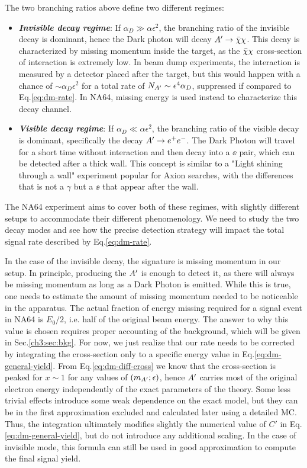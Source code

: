 The two branching ratios above define two different regimes:
\begin{itemize}
\item \textbf{\textit{Invisible decay regime}}: If $\alpha_D \gg \alpha \epsilon^2$, the branching ratio of the invisible decay is dominant, hence the Dark photon will decay $A' \to \bar{\chi} \chi$. This decay is characterized by missing momentum inside the target, as the $\bar{\chi} \chi$ cross-section of interaction is extremely low. In beam dump experiments, the interaction is measured by a detector placed after the target, but this would happen with a chance of $\sim \alpha_D \epsilon^2$ for a total rate of $N_{A'} \sim \epsilon^4 \alpha_D$, suppressed if compared to Eq.\ref{eq:dm-rate}. In NA64, missing energy is used instead to characterize this decay channel. 
\item \textbf{\textit{Visible decay regime}}: If $\alpha_D \ll \alpha \epsilon^2$, the branching ratio of the visible decay is dominant, specifically the decay $A' \to e^+e^-$. The Dark Photon will travel for a short time without interaction and then decay into a $\ee$ pair, which can be detected after a thick wall. This concept is similar to a "Light shining through a wall" experiment popular for Axion searches, with the differences that is not a $\gamma$ but a $\ee$ that appear after the wall.
\end{itemize}

The NA64 experiment aims to cover both of these regimes, with slightly different setups to accommodate their different phenomenology. We need to study the two decay modes and see how the precise detection strategy will impact the total signal rate described by Eq.\ref{eq:dm-rate}.

In the case of the invisible decay, the signature is missing momentum in our setup. In principle, producing the $A'$ is enough to detect it, as there will always be missing momentum as long as a Dark Photon is emitted. While this is true, one needs to estimate the amount of missing momentum needed to be noticeable in the apparatus. The actual fraction of energy missing required for a signal event in NA64 is $E_0/2$, i.e. half of the original beam energy. The answer to why this value is chosen requires proper accounting of the background, which will be given in Sec.\ref{ch3:sec:bkg}.  For now, we just realize that our rate needs to be corrected by integrating the cross-section only to a specific energy value in Eq.\ref{eq:dm-general-yield}. From Eq.\ref{eq:dm-diff-cross} we know that the cross-section is peaked for $x \sim 1$ for any values of $(m_{A'};\epsilon)$, hence $A'$ carries most of the original electron energy independently of the exact parameters of the theory. Some less trivial effects introduce some weak dependence on the exact model, but they can be in the first approximation excluded and calculated later using a detailed MC. Thus, the integration ultimately modifies slightly the numerical value of $C'$ in Eq.\ref{eq:dm-general-yield}, but do not introduce any additional scaling. In the case of invisible mode, this formula can still be used in good approximation to compute the final signal yield.

